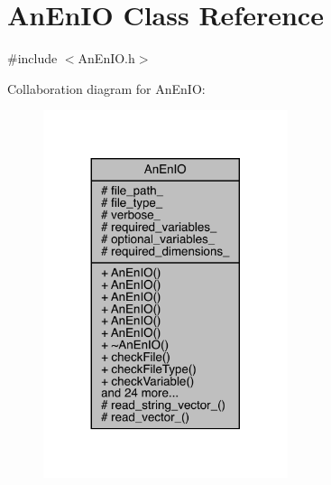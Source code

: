 \hypertarget{class_an_en_i_o}{}\section{An\+En\+IO Class Reference}
\label{class_an_en_i_o}


{\ttfamily \#include $<$An\+En\+I\+O.\+h$>$}



Collaboration diagram for An\+En\+IO\+:
\nopagebreak
\begin{figure}[H]
\begin{center}
\leavevmode
\includegraphics[width=203pt]{class_an_en_i_o__coll__graph}
\end{center}
\end{figure}
